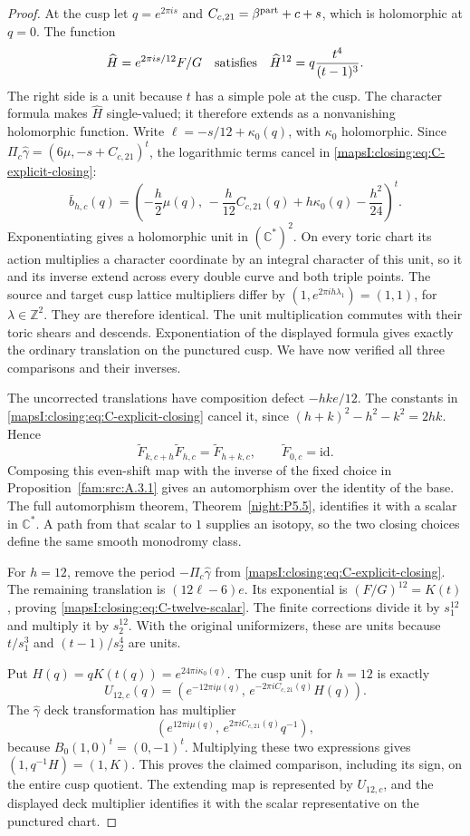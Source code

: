 \begin{proof}
At the cusp let \(q=e^{2\pi i s}\) and
\(C_{c,21}=\beta^{\rm part}+c+s\), which is holomorphic at
\(q=0\). The function
\[
 \widehat H=e^{2\pi i s/12}F/G
 \quad\hbox{satisfies}\quad
 \widehat H^{12}=q\frac{t^4}{(t-1)^3}.
\]
The right side is a unit because \(t\) has a simple pole at the
cusp. The character formula makes \(\widehat H\) single-valued;
it therefore extends as a nonvanishing holomorphic function. Write
\(\ell=-s/12+\kappa_0(q)\), with \(\kappa_0\) holomorphic.
Since
\(\Pi_c\widehat\gamma=(6\mu,-s+C_{c,21})^t\),
the logarithmic terms cancel in \eqref{mapsI:closing:eq:C-explicit-closing}:
\[
 \bar b_{h,c}(q)=
 \left(-\frac h2\mu(q),\,
 -\frac h{12}C_{c,21}(q)+h\kappa_0(q)-\frac{h^2}{24}\right)^t.
\]
Exponentiating gives a holomorphic unit in \((\mathbb C^*)^2\).
On every toric chart its action multiplies a character coordinate
by an integral character of this unit, so it and its inverse
extend across every double curve and both triple points. The
source and target cusp lattice multipliers differ by
\((1,e^{2\pi i h\lambda_1})=(1,1)\), for
\(\lambda\in\mathbb Z^2\). They are therefore identical. The
unit multiplication commutes with their toric shears and descends.
Exponentiation of the displayed formula gives exactly the ordinary
translation on the punctured cusp. We have now verified all
three comparisons and their inverses.

The uncorrected translations have composition defect
\(-hk e/12\). The constants in
\eqref{mapsI:closing:eq:C-explicit-closing} cancel it, since
\((h+k)^2-h^2-k^2=2hk\). Hence
\[
 \widetilde F_{k,c+h}\widetilde F_{h,c}
       =\widetilde F_{h+k,c},\qquad
 \widetilde F_{0,c}=\mathrm{id}.
\]
Composing this even-shift map with the inverse of the fixed choice in Proposition~\ref{fam:src:A.3.1} gives an automorphism over the identity of the base. The full automorphism theorem, Theorem~\ref{night:P5.5}, identifies it with a scalar in $\mathbb C^*$. A path from that scalar to $1$ supplies an isotopy, so the two closing choices define the same smooth monodromy class.

For \(h=12\), remove the period
\(-\Pi_c\widehat\gamma\) from \eqref{mapsI:closing:eq:C-explicit-closing}.
The remaining translation is \((12\ell-6)e\). Its exponential
is \((F/G)^{12}=K(t)\), proving
\eqref{mapsI:closing:eq:C-twelve-scalar}. The finite corrections divide it by
\(s_1^{12}\) and multiply it by \(s_2^{12}\). With the original
uniformizers, these are units because
\(t/s_1^3\) and \((t-1)/s_2^4\) are units. 

Put \(H(q)=qK(t(q))=e^{24\pi i\kappa_0(q)}\). The cusp unit
for \(h=12\) is exactly
\[
 U_{12,c}(q)=
 \left(e^{-12\pi i\mu(q)},\,
       e^{-2\pi i C_{c,21}(q)}H(q)\right).
\]
The \(\widehat\gamma\) deck transformation has multiplier
\[
 \left(e^{12\pi i\mu(q)},\,
       e^{2\pi i C_{c,21}(q)}q^{-1}\right),
\]
because \(B_0(1,0)^t=(0,-1)^t\). Multiplying these two
expressions gives \((1,q^{-1}H)=(1,K)\). This proves the
claimed comparison, including its sign, on the entire cusp
quotient. The extending map is represented by $U_{12,c}$, and the displayed deck multiplier identifies it with the scalar representative on the punctured chart.


\end{proof}
